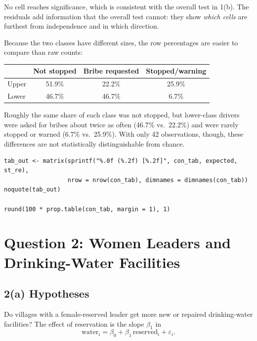 \documentclass[11pt]{article}
\begin{document}
No cell reaches significance, which is consistent with the overall test in 1(b). The residuals add information that the overall test cannot: they show \emph{which cells} are furthest from independence and in which direction.

Because the two classes have different sizes, the row percentages are easier to compare than raw counts:

\begin{center}
\begin{tabular}{lccc}
\toprule
 & Not stopped & Bribe requested & Stopped/warning \\
\midrule
Upper & 51.9\% & 22.2\% & 25.9\% \\
Lower & 46.7\% & 46.7\% & 6.7\% \\
\bottomrule
\end{tabular}
\end{center}

Roughly the same share of each class was not stopped, but lower-class drivers were asked for bribes about twice as often (46.7\% vs.\ 22.2\%) and were rarely stopped or warned (6.7\% vs.\ 25.9\%). With only 42 observations, though, these differences are not statistically distinguishable from chance.

\begin{lstlisting}
tab_out <- matrix(sprintf("%.0f (%.2f) [%.2f]", con_tab, expected, st_re),
                  nrow = nrow(con_tab), dimnames = dimnames(con_tab))
noquote(tab_out)

round(100 * prop.table(con_tab, margin = 1), 1)

\end{lstlisting}

\section*{Question 2: Women Leaders and Drinking-Water Facilities}

\subsection*{2(a) Hypotheses}

Do villages with a female-reserved leader get more new or repaired drinking-water facilities? The effect of reservation is the slope $\beta_1$ in
\[
\text{water}_i = \beta_0 + \beta_1\,\text{reserved}_i + \varepsilon_i.
\]
\end{document}
